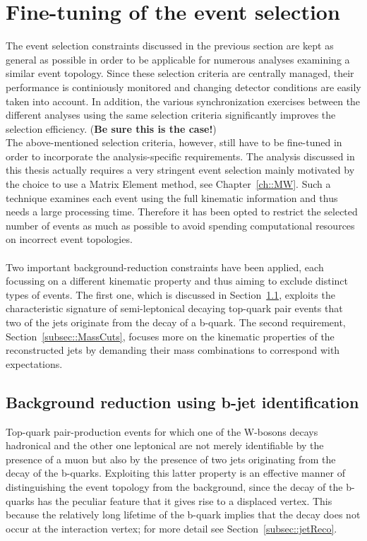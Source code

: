 \section{Fine-tuning of the event selection}\label{sec::SpecificSelec}

The event selection constraints discussed in the previous section are kept as general as possible in order to be applicable for numerous analyses examining a similar event topology.
Since these selection criteria are centrally managed, their performance is continiously monitored and changing detector conditions are easily taken into account.
In addition, the various synchronization exercises between the different analyses using the same selection criteria significantly improves the selection efficiency. (\textbf{Be sure this is the case!})
\\

The above-mentioned selection criteria, however, still have to be fine-tuned in order to incorporate the analysis-specific requirements.
The analysis discussed in this thesis actually requires a very stringent event selection mainly motivated by the choice to use a Matrix Element method, see Chapter~\ref{ch::MW}. Such a technique examines each event using the full kinematic information and thus needs a large processing time. Therefore it has been opted to restrict the selected number of events as much as possible to avoid spending computational resources on incorrect event topologies.
\\
\\
Two important background-reduction constraints have been applied, each focussing on a different kinematic property and thus aiming to exclude distinct types of events. 
The first one, which is discussed in Section~\ref{subsec::BTag}, exploits the characteristic signature of semi-leptonical decaying top-quark pair events that two of the jets originate from the decay of a b-quark. The second requirement, Section~\ref{subsec::MassCuts}, focuses more on the kinematic properties of the reconstructed jets by demanding their mass combinations to correspond with expectations.

\subsection{Background reduction using b-jet identification}\label{subsec::BTag}

Top-quark pair-production events for which one of the W-bosons decays hadronical and the other one leptonical are not merely identifiable by the presence of a muon but also by the presence of two jets originating from the decay of the b-quarks.
Exploiting this latter property is an effective manner of distinguishing the event topology from the background, since the decay of the b-quarks has the peculiar feature that it gives rise to a displaced vertex. This because the relatively long lifetime of the b-quark implies that the decay does not occur at the interaction vertex; for more detail see Section~\ref{subsec::jetReco}.
\\ 

